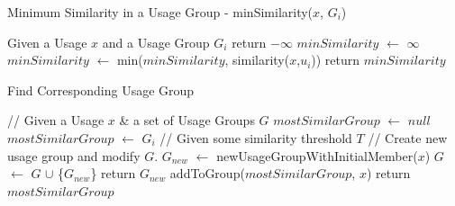 \documentclass[conference]{IEEEtran}
\begin{document}
\begin{algorithm}
    \caption{Minimum Similarity in a Usage Group - minSimilarity($x$, $G_{i}$)} 
    \begin{algorithmic}[1]
    \State Given a Usage $x$ and a Usage Group $G_{i}$
    \State return  $-\infty$
    \EndIf
    \State $minSimilarity$ $\leftarrow$ $\infty$
    \State $minSimilarity$ $\leftarrow$ min($minSimilarity$, similarity($x$,$u_{i}$))
    \EndFor
    \State return $minSimilarity$
    \end{algorithmic} 
\end{algorithm}


\begin{algorithm}
    \caption{Find Corresponding Usage Group} 
    \begin{algorithmic}[1]
    \State // Given a Usage $x$ \& a set of Usage Groups $G$
    \State $mostSimilarGroup$ $\leftarrow$ $null$
    \State $mostSimilarGroup$ $\leftarrow$ $G_{i}$
    \EndIf
    \EndFor
    \State // Given some similarity threshold $T$
        \State // Create new usage group and modify $G$.
        \State $G_{new}$ $\leftarrow$ newUsageGroupWithInitialMember($x$)
        \State $G$ $\leftarrow$ $G$ $\cup$ \{$G_{new}$\}
        \State return $G_{new}$
    \EndIf
    \State addToGroup($mostSimilarGroup$, $x$)
    \State return $mostSimilarGroup$
    \end{algorithmic} 
\end{algorithm}
\end{document}
